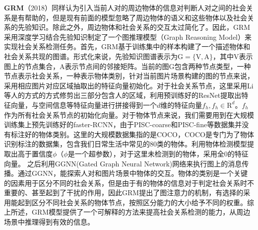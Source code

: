 \textbf{GRM}（2018）\cite{wang2018deep}同样认为引入当前人对的周边物体的信息对判断人对之间的社会关系是有帮助的，但是现有前面的模型忽略了周边物体的语义和这些物体以及社会关系的先验知识。除此之外，周边物体和社会关系的交互太过简化了。因此，GRM采用深度学习结合先验知识制定了一个图推理模型（Graph Reasoning Model）来实现社会关系检测任务。首先，GRM基于训练集中的样本构建了一个描述物体和社会关系共现的图谱。形式化来说，先验知识图谱表示为$\mathrm{G} = \{\mathrm{V},\mathrm{A}\}$，其中$\mathrm{V}$表示图上的节点集合，$\mathrm{A}$表示节点间的邻接矩阵。当前的图$\mathrm{G}$包含两种节点类型，一种节点表示社会关系，一种表示物体类别，针对当前图片场景构建的图的节点来说，采用相应图片对应区域抽取出的特征向量初始化。对于社会关系节点，这里采用Li等人的方式\cite{li2017dual-glance}的方式修剪出三部分包含人的区域，利用预训练好的ResNet提取出特征向量，与空间信息等特征向量进行拼接得到一个$d$维的特征向量$f_{h},f_{h} \in \mathrm{R}^d$。$f_h$作为所有社会关系节点的初始化向量。对于物体节点来说，我们需要用到在大规模训练集上预先训练好的faster-RCNN\cite{ren2015faster}，由于PISC-coarse和PISC-fine等数据集并没有标注好的物体类别。这里的大规模数据集指的是COCO\cite{lin2014microsoft}，COCO是专门为了物体识别标注的数据集，包含我们日常生活中常见的80类的物体。利用物体检测模型提取出高于置信度$\phi$（$\phi$是一个超参数），对于这里未检测到的物体，采用全$0$的特征向量。
之后利用GGNN(Gated Graph Neural Network)网络\cite{li2016gated}来执行图上的消息传播。通过GGNN，能探索人对和图片场景中物体的交互。物体的类别是一个关键的因素用于区分不同的社会关系，但是由于有的物体的信息对于判定社会关系时不重要的、甚至起到了干扰的作用，因此GRM提出了图注意力的机制，有选择的采用能起到区分不同社会关系的物体节点，按照区分能力的大小给予不同的权重。综上所述，GRM模型提供了一个可解释的方法来提高社会关系检测的能力，从周边场景中推理得到有效的信息。

